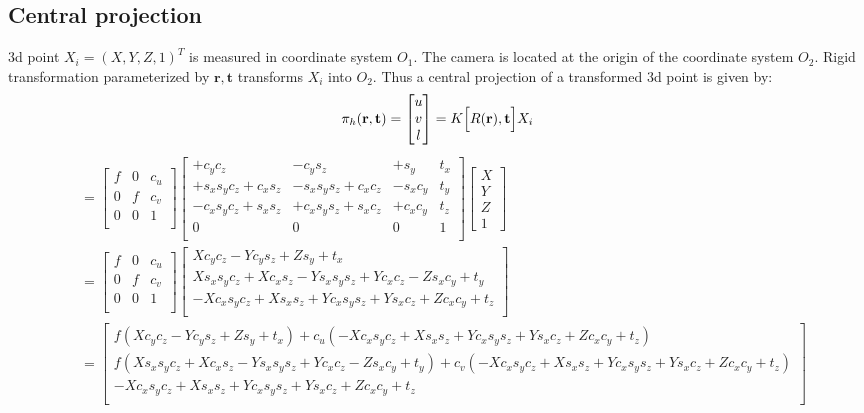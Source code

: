 \documentclass[10pt]{article}         %
\begin{document}
\subsection{Central projection}
3d point $X_i = (X,Y,Z,1)^T$ is measured in coordinate system $O_1$.  The camera is located at the origin of the coordinate system $O_2$.  Rigid transformation parameterized by $\mathbf{r,t}$ transforms $X_i$ into $O_2$.  Thus a central projection of a transformed 3d point is given by:
$$
\pi_h(\mathbf{r,t}) =\begin{bmatrix} u\\v\\l \end{bmatrix} =  K\Big[R(\mathbf{r}), \mathbf{t}\Big]X_i\\
$$
\begin{align*} &=
  \begin{bmatrix} f& 0& c_u\\ 0& f& c_v\\0& 0& 1\\ \end{bmatrix}
  \begin{bmatrix}
    +c_yc_z& -c_ys_z& +s_y & t_x\\
    +s_xs_yc_z+c_xs_z& -s_xs_ys_z+c_xc_z& -s_xc_y & t_y\\
    -c_xs_yc_z+s_xs_z& +c_xs_ys_z+s_xc_z& +c_xc_y & t_z\\
    0 & 0 & 0 & 1\\
  \end{bmatrix}
  \begin{bmatrix}X\\Y\\Z\\1\end{bmatrix}\\
    &= \begin{bmatrix} f& 0& c_u\\ 0& f& c_v\\0& 0& 1\\ \end{bmatrix}
    \begin{bmatrix}
      Xc_yc_z-Yc_ys_z+Zs_y+t_x\\
      Xs_xs_yc_z+Xc_xs_z-Ys_xs_ys_z+Yc_xc_z-Zs_xc_y+t_y\\
      -Xc_xs_yc_z+Xs_xs_z+Yc_xs_ys_z+Ys_xc_z+Zc_xc_y+t_z\\
    \end{bmatrix}\\
    &=\begin{bmatrix}
      f(Xc_yc_z-Yc_ys_z+Zs_y+t_x)+c_u(-Xc_xs_yc_z+Xs_xs_z+Yc_xs_ys_z+Ys_xc_z+Zc_xc_y+t_z)\\
      f(Xs_xs_yc_z+Xc_xs_z-Ys_xs_ys_z+Yc_xc_z-Zs_xc_y+t_y)+c_v(-Xc_xs_yc_z+Xs_xs_z+Yc_xs_ys_z+Ys_xc_z+Zc_xc_y+t_z)\\
      -Xc_xs_yc_z+Xs_xs_z+Yc_xs_ys_z+Ys_xc_z+Zc_xc_y+t_z\\
    \end{bmatrix}\\
\end{align*}
\end{document}
